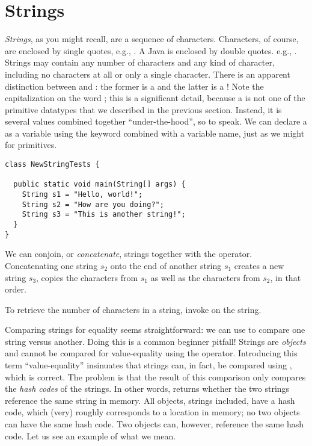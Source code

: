 \section{Strings}

\textit{Strings}, as you might recall, are a sequence of characters. Characters, of course, are enclosed by single quotes, e.g., . A Java  is enclosed by double quotes. e.g., . Strings may contain any number of characters and any kind of character, including no characters at all or only a single character. There is an apparent distinction between  and : the former is a  and the latter is a ! Note the capitalization on the word ; this is a significant detail, because a  is not one of the primitive datatypes that we described in the previous section. Instead, it is several  values combined together ``under-the-hood'', so to speak. We can declare a  as a variable using the keyword combined with a variable name, just as we might for primitives. 

\begin{cl}[]{}
\begin{lstlisting}[language=MyJava]
class NewStringTests {

  public static void main(String[] args) {
    String s1 = "Hello, world!";
    String s2 = "How are you doing?";
    String s3 = "This is another string!";
  }
}
\end{lstlisting}
\end{cl}

We can conjoin, or \textit{concatenate}, strings together with the \ttt{+} operator. Concatenating one string $s_2$ onto the end of another string $s_1$ creates a new string $s_3$, copies the characters from $s_1$ as well as the characters from $s_2$, in that order. 

To retrieve the number of characters in a string, invoke  on the string.

Comparing strings for equality seems straightforward: we can use \ttt{==} to compare one string versus another. Doing this is a common beginner pitfall! Strings are \textit{objects} and cannot be compared for value-equality using the \ttt{==} operator. Introducing this term ``value-equality'' insinuates that strings can, in fact, be compared using \ttt{==}, which is correct. The problem is that the result of this comparison only compares the \textit{hash codes} of the strings. In other words,  returns whether the two strings reference the same string in memory. All objects, strings included, have a hash code, which (very) roughly corresponds to a location in memory; no two objects can have the same hash code. Two objects can, however, reference the same hash code. Let us see an example of what we mean.

